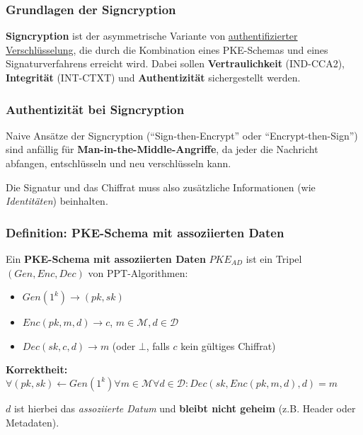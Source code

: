 \documentclass[12pt,A4]{extarticle}
\newcommand{\highlight}[1]{\textcolor{highlightColor}{\textbf{#1}}}
\begin{document}
\subsubsection{Grundlagen der Signcryption}
\highlight{Signcryption} ist der asymmetrische Variante von \hyperref[sec:symmetrischeVerschluesselungAuthentifizierteVerschluesselung]{authentifizierter Verschlüsselung}, die durch die Kombination eines PKE-Schemas und eines Signaturverfahrens erreicht wird.
Dabei sollen \textbf{Vertraulichkeit} (IND-CCA2), \textbf{Integrität} (INT-CTXT) und \textbf{Authentizität} sichergestellt werden.

\subsubsection{Authentizität bei Signcryption}
Naive Ansätze der Signcryption (``Sign-then-Encrypt'' oder ``Encrypt-then-Sign'') sind anfällig für \textbf{Man-in-the-Middle-Angriffe}, da jeder die Nachricht abfangen, entschlüsseln und neu verschlüsseln kann.\par
Die Signatur und das Chiffrat muss also zusätzliche Informationen (wie \textit{Identitäten}) beinhalten.

\subsubsection{Definition: PKE-Schema mit assoziierten Daten}
Ein \textbf{PKE-Schema mit assoziierten Daten} $PKE_{AD}$ ist ein Tripel $(Gen, Enc, Dec)$ von PPT-Algorithmen:
\begin{itemize}
  \item{$Gen(1^k) \rightarrow (pk, sk)$}
  \item{$Enc(pk, m, d) \rightarrow c$, $m \in \mathcal{M}, d \in \mathcal{D}$}
  \item{$Dec(sk, c, d) \rightarrow  m$ (oder $\bot$, falls $c$ kein gültiges Chiffrat)}
\end{itemize}
\textbf{Korrektheit:} $\forall (pk, sk) \leftarrow Gen(1^k) \forall m \in \mathcal{M} \forall d \in \mathcal{D}: Dec(sk, Enc(pk, m, d), d) = m$\par
$d$ ist hierbei das \textit{assoziierte Datum} und \textbf{bleibt nicht geheim} (z.B. Header oder Metadaten).
\end{document}

